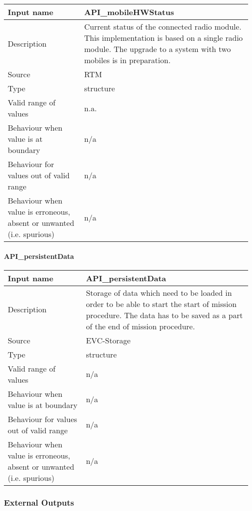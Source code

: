 \begin{longtable}{p{}p{}}
\toprule
Input name				& API\_mobileHWStatus \\
\midrule
Description				& Current status of the connected radio module. This implementation is based on a single radio module. The upgrade to a system with two mobiles is in preparation.\\
\midrule
Source					& RTM \\ 
\midrule
Type					& structure \\
\midrule
Valid range of values	& n.a. \\
\midrule
Behaviour when value is at boundary	& n/a \\
\midrule
Behaviour for values out of valid range	& n/a \\
\midrule
Behaviour when value is erroneous, absent or unwanted (i.e. spurious) & n/a \\
\bottomrule
\end{longtable}

\paragraph{API\_persistentData}

\begin{longtable}{p{}p{}}
\toprule
Input name				& API\_persistentData \\
\midrule
Description				& Storage of data which need to be loaded in order to be able to start the start of mission procedure. The data has to be saved as a part of the end of mission procedure. \\
\midrule
Source					& EVC-Storage \\ 
\midrule
Type					& structure \\
\midrule
Valid range of values	& n/a \\
\midrule
Behaviour when value is at boundary	& n/a \\
\midrule
Behaviour for values out of valid range	& n/a \\
\midrule
Behaviour when value is erroneous, absent or unwanted (i.e. spurious) &n/a \\
\bottomrule
\end{longtable}



\subsubsection{External Outputs}

